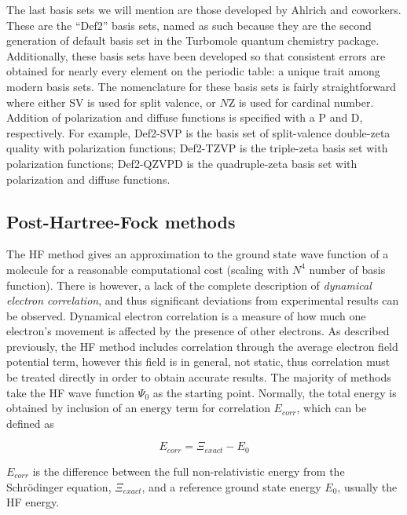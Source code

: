 The last basis sets we will mention are those developed by Ahlrich and coworkers.\cite{Schafer1992, Weigend2005} These are the ``Def2'' basis sets, named as such because they are the second generation of default basis set in the Turbomole quantum chemistry package.\cite{turbomole} Additionally, these basis sets have been developed so that consistent errors are obtained for nearly every element on the periodic table: a unique trait among modern basis sets. The nomenclature for these basis sets is fairly straightforward where either SV is used for split valence, or $N$Z is used for cardinal number. Addition of polarization and diffuse functions is specified with a P and D, respectively. For example, Def2-SVP is the basis set of split-valence double-zeta quality with polarization functions; Def2-TZVP is the triple-zeta basis set with polarization functions; Def2-QZVPD is the quadruple-zeta basis set with polarization and diffuse functions.

\subsection{Post-Hartree-Fock methods}

The HF method gives an approximation to the ground state wave function of a molecule for a reasonable computational cost (scaling with $N^4$ number of basis function). There is however, a lack of the complete description of \emph{dynamical electron correlation},\cite{Cramer2004} and thus significant deviations from experimental results can be observed. Dynamical electron correlation is a measure of how much one electron's movement is affected by the presence of other electrons. As described previously, the HF method includes correlation through the average electron field potential term, however this field is in general, not static, thus correlation must be treated directly in order to obtain accurate results. The majority of methods take the HF wave function $\Psi_0$ as the starting point. Normally, the total energy is obtained by inclusion of an energy term for correlation $E_{corr}$, which can be defined as

\begin{equation}
  E_{corr} = \Xi_{exact} - E_0
\end{equation}

\noindent $E_{corr}$ is the difference between the full non-relativistic energy from the Schr{\"o}dinger equation, $\Xi_{exact}$, and a reference ground state energy $E_0$, usually the HF energy.

